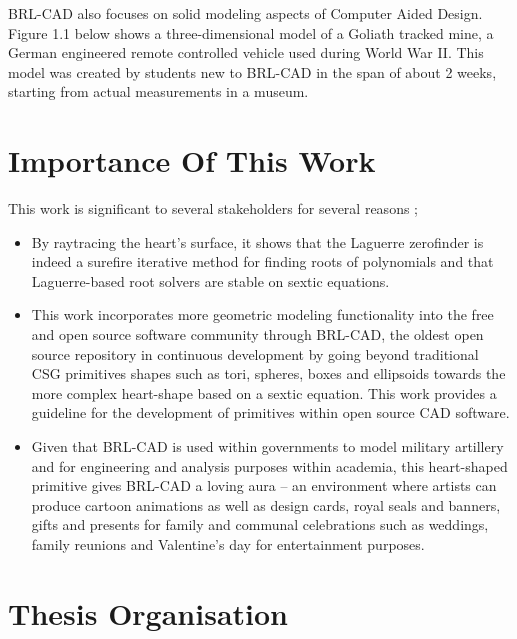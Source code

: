 \hspace{30} BRL­-CAD also focuses on solid modeling aspects of Computer ­Aided
Design. Figure 1.1 below shows a three-­dimensional model of a Goliath tracked
mine, a German engineered remote controlled vehicle used during World War II.
This model was created by students new to BRL-­CAD in the span of about 2
weeks, starting from actual measurements in a museum.


\section{Importance Of This Work}

This work is significant to several stakeholders for several reasons ;

\begin{itemize}
\item By ray­tracing the heart's surface, it shows that the Laguerre zero­finder is indeed a sure­fire iterative
method for finding roots of polynomials and that Laguerre-­based root 
solvers are stable on sextic equations.
\item This work incorporates more geometric modeling functionality into 
the free and open source software community through BRL-­CAD, the oldest open 
source repository in continuous development \cite{3} by going beyond traditional 
CSG primitives shapes such as tori, spheres, boxes and ellipsoids towards the more
complex heart-shape based on a sextic equation. This work provides a guideline 
for the development of primitives within open source CAD software.
\item Given that BRL­-CAD is used within governments to model military artillery
 and for engineering and analysis purposes within academia, this
heart­-shaped primitive gives BRL-­CAD a loving aura – an 
environment where artists can produce cartoon animations as well as
design cards, royal seals and banners, gifts and presents for family and
communal celebrations such as weddings, family reunions and
Valentine's day for entertainment purposes.
\end{itemize}


\section{Thesis Organisation}

